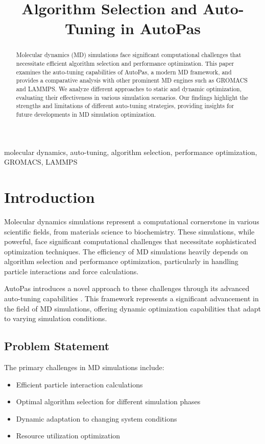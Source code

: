 \documentclass[conference]{IEEEtran}
\begin{document}
\title{Algorithm Selection and Auto-Tuning in AutoPas}

\author{
}

\maketitle

\begin{abstract}
    Molecular dynamics (MD) simulations face significant computational challenges that necessitate efficient algorithm selection and performance optimization. This paper examines the auto-tuning capabilities of AutoPas, a modern MD framework, and provides a comparative analysis with other prominent MD engines such as GROMACS and LAMMPS. We analyze different approaches to static and dynamic optimization, evaluating their effectiveness in various simulation scenarios. Our findings highlight the strengths and limitations of different auto-tuning strategies, providing insights for future developments in MD simulation optimization.
\end{abstract}

\begin{IEEEkeywords}
    molecular dynamics, auto-tuning, algorithm selection, performance optimization, GROMACS, LAMMPS
\end{IEEEkeywords}

\section{Introduction}
Molecular dynamics simulations represent a computational cornerstone in various scientific fields, from materials science to biochemistry. These simulations, while powerful, face significant computational challenges that necessitate sophisticated optimization techniques. The efficiency of MD simulations heavily depends on algorithm selection and performance optimization, particularly in handling particle interactions and force calculations.

AutoPas introduces a novel approach to these challenges through its advanced auto-tuning capabilities \cite{Gratl2019AutoPasAF}. This framework represents a significant advancement in the field of MD simulations, offering dynamic optimization capabilities that adapt to varying simulation conditions.

\subsection{Problem Statement}
The primary challenges in MD simulations include:
\begin{itemize}
    \item Efficient particle interaction calculations
    \item Optimal algorithm selection for different simulation phases
    \item Dynamic adaptation to changing system conditions
    \item Resource utilization optimization
\end{itemize}
\end{document}
